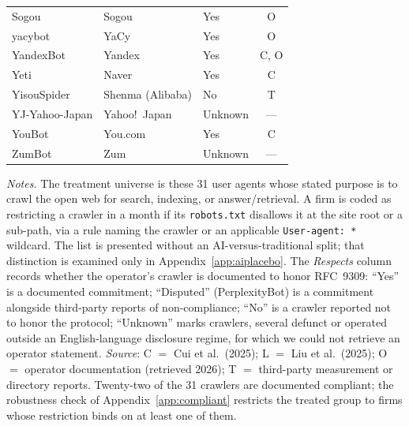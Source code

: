 \begin{table}[p]
\begin{threeparttable}
\begin{tabular}{lllc}
Sogou            & Sogou             & Yes      & O \\
yacybot          & YaCy              & Yes      & O \\
YandexBot        & Yandex            & Yes      & C, O \\
Yeti             & Naver             & Yes      & C \\
YisouSpider      & Shenma (Alibaba)  & No       & T \\
YJ-Yahoo-Japan   & Yahoo!\ Japan     & Unknown  & --- \\
YouBot           & You.com           & Yes      & C \\
ZumBot           & Zum               & Unknown  & --- \\
\bottomrule
\end{tabular}
\begin{tablenotes}\footnotesize
\item \textit{Notes.} The treatment universe is these 31 user agents whose stated purpose is to crawl the open web for search, indexing, or answer/retrieval. A firm is coded as restricting a crawler in a month if its \texttt{robots.txt} disallows it at the site root or a sub-path, via a rule naming the crawler or an applicable \texttt{User-agent: *} wildcard. The list is presented without an AI-versus-traditional split; that distinction is examined only in Appendix~\ref{app:aiplacebo}. The \textit{Respects} column records whether the operator's crawler is documented to honor RFC~9309: ``Yes'' is a documented commitment; ``Disputed'' (PerplexityBot) is a commitment alongside third-party reports of non-compliance; ``No'' is a crawler reported not to honor the protocol; ``Unknown'' marks crawlers, several defunct or operated outside an English-language disclosure regime, for which we could not retrieve an operator statement. \textit{Source}: C $=$ Cui et al.\ (2025); L $=$ Liu et al.\ (2025); O $=$ operator documentation (retrieved 2026); T $=$ third-party measurement or directory reports. Twenty-two of the 31 crawlers are documented compliant; the robustness check of Appendix~\ref{app:compliant} restricts the treated group to firms whose restriction binds on at least one of them.
\end{tablenotes}
\end{threeparttable}
\end{table}
